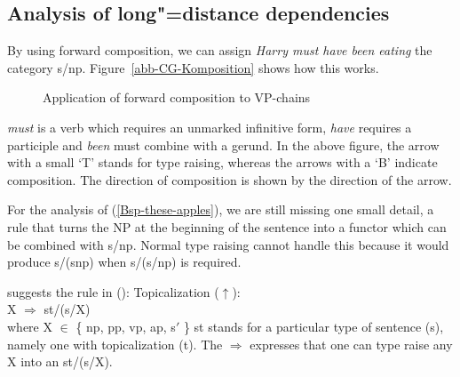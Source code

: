 \subsection{Analysis of long"=distance dependencies}
\label{Abschnitt-CG-UDC}

By using forward composition, we can assign \emph{Harry must have been eating} the category
s/np. Figure~\vref{abb-CG-Komposition} shows how this works.
\begin{figure}
\centerline{%
}
\caption{\label{abb-CG-Komposition}Application of forward composition to VP-chains}
\end{figure}%
\emph{must} is a verb which requires an unmarked infinitive form,  \emph{have} requires a participle and \emph{been} must combine with a
gerund. In the above figure, the arrow with a small `T' stands for type raising, whereas the arrows with a `B' indicate composition.
The direction of composition is shown by the direction of the arrow.

For the analysis of (\ref{Bsp-these-apples}), we are still missing one small detail, a rule that turns the NP at the beginning of the sentence
into a functor which can be combined with s/np. Normal type raising cannot handle this because it would produce s/(s\bs np) when s/(s/np)
is required.

\citet[]{Steedman89a} suggests the rule in ():
\ea
\label{Regel-Topikalisierung}
Topicalization ($\uparrow$\is{$\uparrow$}):\\
X $\Rightarrow$ st/(s/X)\\
where X $\in$ \{ np, pp, vp, ap, s$'$ \}
\z
st stands for a particular type of sentence (s), namely one with topicalization (t). The
$\Rightarrow$ expresses that one can type raise any X into an st/(s/X). 

